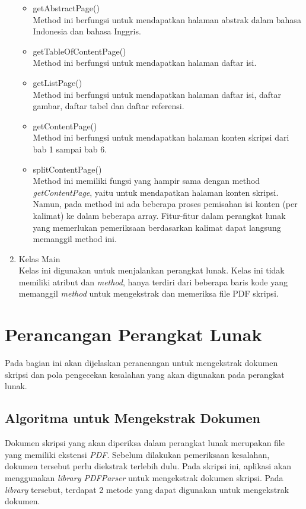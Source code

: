 \begin{enumerate}
\begin{itemize}
			\item getAbstractPage() \\
			Method ini berfungsi untuk mendapatkan halaman abstrak dalam bahasa Indonesia dan bahasa Inggris.
			
			\item getTableOfContentPage() \\
			Method ini berfungsi untuk mendapatkan halaman daftar isi.
			
			\item getListPage() \\
			Method ini berfungsi untuk mendapatkan halaman daftar isi, daftar gambar, daftar tabel dan daftar referensi.
			
			\item getContentPage() \\
			Method ini berfungsi untuk mendapatkan halaman konten skripsi dari bab 1 sampai bab 6.
			
			\item splitContentPage() \\
			Method ini memiliki fungsi yang hampir sama dengan method \textit{getContentPage}, yaitu untuk mendapatkan halaman konten skripsi. Namun, pada method ini ada beberapa proses pemisahan isi konten (per kalimat) ke dalam beberapa array. Fitur-fitur dalam perangkat lunak yang memerlukan pemeriksaan berdasarkan kalimat dapat langsung memanggil method ini. 
			
		\end{itemize}
	
	\item Kelas Main \\
	Kelas ini digunakan untuk menjalankan perangkat lunak. Kelas ini tidak memiliki atribut dan \textit{method}, hanya terdiri dari beberapa baris kode yang memanggil \textit{method} untuk mengekstrak dan memeriksa file PDF skripsi. 

\end{enumerate} 

\section{Perancangan Perangkat Lunak}
Pada bagian ini akan dijelaskan perancangan untuk mengekstrak dokumen skripsi dan pola pengecekan kesalahan yang akan digunakan pada perangkat lunak.
 
\subsection{Algoritma untuk Mengekstrak Dokumen}
Dokumen skripsi yang akan diperiksa dalam perangkat lunak merupakan file yang memiliki ekstensi \textit{PDF}. Sebelum dilakukan pemeriksaan kesalahan, dokumen tersebut perlu diekstrak terlebih dulu. Pada skripsi ini, aplikasi akan menggunakan \textit{library PDFParser} untuk mengekstrak dokumen skripsi. Pada \textit{library} tersebut, terdapat 2 metode yang dapat digunakan untuk mengekstrak dokumen.
	
